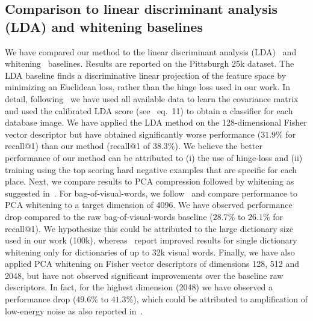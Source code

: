   \subsection{{Comparison to linear discriminant analysis (LDA) and whitening baselines}}
  \label{sec:LDA}
    {
      We have compared our method to the linear discriminant analysis (LDA)~\cite{Aubry13,Hariharan12,Gharbi12} and whitening~\cite{JegouChum12} baselines. Results are reported on the Pittsburgh 25k dataset. The LDA baseline finds a discriminative linear projection of the feature space by minimizing an Euclidean loss, rather than the hinge loss used in our work. In detail, following~\cite{Aubry13} we have used all available data to learn the covariance matrix and used the calibrated LDA score (see~\cite{Aubry13} eq.~11) to obtain a classifier for each database image.  
      We have applied the LDA method on the 128-dimensional Fisher vector descriptor but have obtained significantly worse performance ($31.9\%$ for recall@1) than our method (recall@1 of 38.3\%). 
      We believe the better performance of our method can be attributed to (i) the use of hinge-loss and (ii) training using the top scoring hard negative examples that are specific for each place.
    }
    {  
      Next, we compare results to PCA compression followed by whitening as suggested in~\cite{JegouChum12}. For bag-of-visual-words, we follow~\cite{JegouChum12} and compare performance to PCA whitening to a target dimension of 4096. We have observed performance drop compared to the raw bag-of-visual-words baseline ($28.7\%$ to $26.1\%$ for recall@1). We hypothesize this could be attributed to the large dictionary size used in our work (100k), whereas~\cite{JegouChum12} report improved results for single dictionary whitening only for dictionaries of up to 32k visual words.
      Finally,  we have also applied PCA whitening on Fisher vector descriptors of dimensions 128, 512 and 2048, but have not observed significant improvements over the baseline raw descriptors. In fact, for the highest dimension (2048) we have observed a performance drop ($49.6\%$ to $41.3\%$), which could be attributed to amplification of low-energy noise as also reported in~\cite{JegouChum12}. 
    }
%
